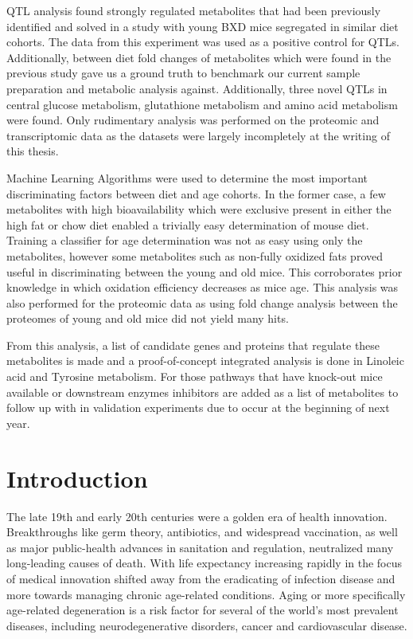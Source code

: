 \documentclass[a4paper]{book}
\begin{document}
QTL analysis found strongly regulated metabolites that had been previously identified and solved in a study with young BXD mice segregated in similar diet cohorts. The data from this experiment was used as a positive control for QTLs. Additionally, between diet fold changes of metabolites which were found in the previous study gave us a ground truth to benchmark our current sample preparation and metabolic analysis against. Additionally, three novel QTLs in central glucose metabolism, glutathione metabolism and amino acid metabolism were found. Only rudimentary analysis was performed on the proteomic and transcriptomic data as the datasets were largely incompletely at the writing of this thesis.

Machine Learning Algorithms were used to determine the most important discriminating factors between diet and age cohorts. In the former case, a few metabolites with high bioavailability which were exclusive present in either the high fat or chow diet enabled a trivially easy determination of mouse diet. Training a classifier for age determination was not as easy using only the metabolites, however some metabolites such as non-fully oxidized fats proved useful in discriminating between the young and old mice. This corroborates prior knowledge in which oxidation efficiency decreases as mice age. This analysis was also performed for the proteomic data as using fold change analysis between the proteomes of young and old mice did not yield many hits.

From this analysis, a list of candidate genes and proteins that regulate these metabolites is made and a proof-of-concept integrated analysis is done in Linoleic acid and Tyrosine metabolism. For those pathways that have knock-out mice available or downstream enzymes inhibitors are added as a list of metabolites to follow up with in validation experiments due to occur at the beginning of next year.

	
	\chapter{Introduction}
	
The late 19th and early 20th centuries were a golden era of health innovation. Breakthroughs like germ theory, antibiotics, and widespread vaccination, as well as major public-health advances in sanitation and regulation, neutralized many long-leading causes of death. With life expectancy increasing rapidly in the focus of medical innovation shifted away from the eradicating of infection disease and more towards managing chronic age-related conditions. Aging or more specifically age-related degeneration is a risk factor for several of the world’s most prevalent diseases, including neurodegenerative disorders, cancer and cardiovascular disease. 
\end{document}

